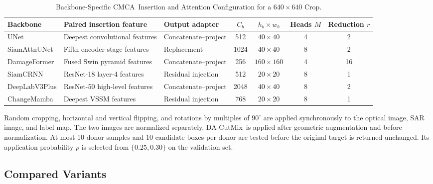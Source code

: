 \documentclass[journal]{IEEEtran}
\newcommand{\cmca}{CMCA}
\newcommand{\dacutmix}{DA-CutMix}
\begin{document}
    \begin{table}[!t]
    \caption{Backbone-Specific \cmca\ Insertion and Attention Configuration for a $640\times640$ Crop.}
    \label{tab:cmca_configuration}
    \centering
    \footnotesize
    \setlength{\tabcolsep}{5pt}
    \renewcommand{\arraystretch}{1.06}
    \begin{tabular}{l l l c c c c}
    \toprule
    Backbone & Paired insertion feature & Output adapter & $C_b$ & $h_b\times w_b$ & Heads $M$ & Reduction $r$ \\
    \midrule
    UNet & Deepest convolutional features & Concatenate--project & 512 & $40\times40$ & 4 & 2 \\
    SiamAttnUNet & Fifth encoder-stage features & Replacement & 1024 & $40\times40$ & 8 & 2 \\
    DamageFormer & Fused Swin pyramid features & Concatenate--project & 256 & $160\times160$ & 4 & 16 \\
    SiamCRNN & ResNet-18 layer-4 features & Residual injection & 512 & $20\times20$ & 8 & 1 \\
    DeepLabV3Plus & ResNet-50 high-level features & Concatenate--project & 2048 & $40\times40$ & 8 & 2 \\
    ChangeMamba & Deepest VSSM features & Residual injection & 768 & $20\times20$ & 8 & 1 \\
    \bottomrule
    \end{tabular}
    \renewcommand{\arraystretch}{1.0}
    \end{table}
    
    Random cropping, horizontal and vertical flipping, and rotations by multiples of $90^\circ$ are applied synchronously to the optical image, SAR image, and label map. The two images are normalized separately. \dacutmix\ is applied after geometric augmentation and before normalization. At most 10 donor samples and 10 candidate boxes per donor are tested before the original target is returned unchanged. Its application probability $p$ is selected from $\{0.25,0.30\}$ on the validation set.
    
    \subsection{Compared Variants}
    \label{subsec:variants}
    
\end{document}
